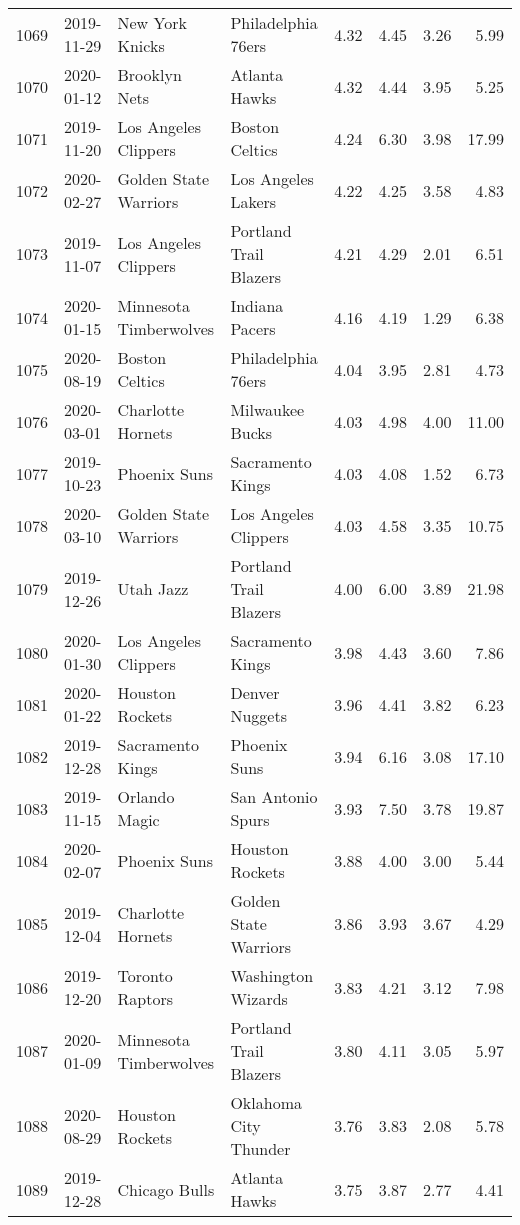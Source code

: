 \documentclass[
  11pt,
]{article}
\theoremstyle{nonumberplain}
\begin{document}
\begin{longtable}{rl|llr|rrr}
1069 & 2019-11-29 & New York Knicks & Philadelphia 76ers & 4.32 & 4.45 & 3.26 & 5.99\\
1070 & 2020-01-12 & Brooklyn Nets & Atlanta Hawks & 4.32 & 4.44 & 3.95 & 5.25\\
1071 & 2019-11-20 & Los Angeles Clippers & Boston Celtics & 4.24 & 6.30 & 3.98 & 17.99\\
1072 & 2020-02-27 & Golden State Warriors & Los Angeles Lakers & 4.22 & 4.25 & 3.58 & 4.83\\
1073 & 2019-11-07 & Los Angeles Clippers & Portland Trail Blazers & 4.21 & 4.29 & 2.01 & 6.51\\
1074 & 2020-01-15 & Minnesota Timberwolves & Indiana Pacers & 4.16 & 4.19 & 1.29 & 6.38\\
1075 & 2020-08-19 & Boston Celtics & Philadelphia 76ers & 4.04 & 3.95 & 2.81 & 4.73\\
1076 & 2020-03-01 & Charlotte Hornets & Milwaukee Bucks & 4.03 & 4.98 & 4.00 & 11.00\\
1077 & 2019-10-23 & Phoenix Suns & Sacramento Kings & 4.03 & 4.08 & 1.52 & 6.73\\
1078 & 2020-03-10 & Golden State Warriors & Los Angeles Clippers & 4.03 & 4.58 & 3.35 & 10.75\\
1079 & 2019-12-26 & Utah Jazz & Portland Trail Blazers & 4.00 & 6.00 & 3.89 & 21.98\\
1080 & 2020-01-30 & Los Angeles Clippers & Sacramento Kings & 3.98 & 4.43 & 3.60 & 7.86\\
1081 & 2020-01-22 & Houston Rockets & Denver Nuggets & 3.96 & 4.41 & 3.82 & 6.23\\
1082 & 2019-12-28 & Sacramento Kings & Phoenix Suns & 3.94 & 6.16 & 3.08 & 17.10\\
1083 & 2019-11-15 & Orlando Magic & San Antonio Spurs & 3.93 & 7.50 & 3.78 & 19.87\\
1084 & 2020-02-07 & Phoenix Suns & Houston Rockets & 3.88 & 4.00 & 3.00 & 5.44\\
1085 & 2019-12-04 & Charlotte Hornets & Golden State Warriors & 3.86 & 3.93 & 3.67 & 4.29\\
1086 & 2019-12-20 & Toronto Raptors & Washington Wizards & 3.83 & 4.21 & 3.12 & 7.98\\
1087 & 2020-01-09 & Minnesota Timberwolves & Portland Trail Blazers & 3.80 & 4.11 & 3.05 & 5.97\\
1088 & 2020-08-29 & Houston Rockets & Oklahoma City Thunder & 3.76 & 3.83 & 2.08 & 5.78\\
1089 & 2019-12-28 & Chicago Bulls & Atlanta Hawks & 3.75 & 3.87 & 2.77 & 4.41\\

\end{longtable}
\end{document}
